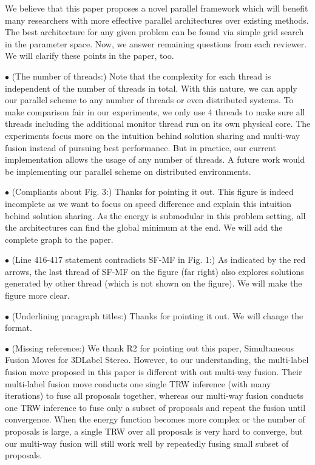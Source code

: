 \documentclass[runningheads]{llncs}
\begin{document}
\vspace{0.15cm} We believe that this paper proposes a novel
parallel framework which will benefit many researchers with
more effective parallel architectures over existing
methods. The best architecture for any given problem can be
found via simple grid search in the parameter space. Now, we
answer remaining questions from each reviewer. We will
clarify these points in the paper, too.

\vspace{0.15cm}

\vspace{0.15cm}
\noindent $\bullet$ (The number of threads:) Note that the
complexity for each thread is independent of the number of
threads in total. With this nature, we can apply our
parallel scheme to any number of threads or even distributed
systems. To make comparison fair in our experiments, we only
use 4 threads to make sure all threads including the
additional monitor thread run on its own physical core. The
experiments focus more on the intuition behind solution
sharing and multi-way fusion instead of pursuing best performance. But in
practice, our current implementation allows the usage of any
number of threads. A future work would be implementing our
parallel scheme on distributed environments.

\noindent $\bullet$ (Compliants about Fig. 3:) Thanks for
pointing it out. This figure is indeed incomplete as we want
to focus on speed difference and explain this intuition behind
solution sharing. As the energy is submodular in this problem setting,
all the architectures can find the global minimum at the
end. We will add the complete graph to the paper.

\noindent $\bullet$ (Line 416-417 statement contradicts SF-MF in Fig. 1:) As indicated by the red arrows, the last thread of SF-MF on the figure (far right) also explores solutions generated by other thread (which is not shown on the figure). We will make the figure more clear.

\noindent $\bullet$ (Underlining paragraph titles:) Thanks for pointing it out. We will change the format.

\vspace{0.15cm}
\noindent $\bullet$ (Missing reference:) We thank R2 for
pointing out this paper, Simultaneous Fusion Moves for
3D­Label Stereo. However, to our understanding, the
multi-label fusion move proposed in this paper is different
with out multi-way fusion. Their multi-label fusion move
conducts one single TRW inference (with many iterations) to
fuse all proposals together, whereas our multi-way fusion
conducts one TRW inference to fuse only a subset of proposals
and repeat the fusion until convergence. When the energy
function becomes more complex or the number of proposals is
large, a single TRW over all proposals is very hard to
converge, but our multi-way fusion will still work well by
repeatedly fusing small subset of proposals.
\end{document}
